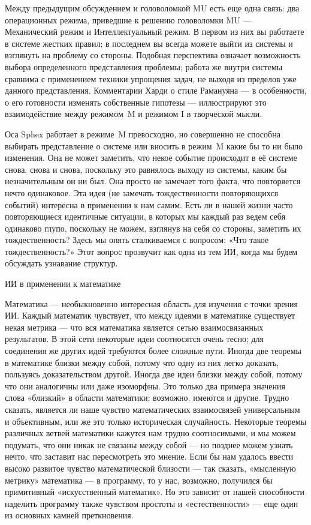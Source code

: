 \documentclass[../main.tex]{subfiles}
\begin{document}
Между предыдущим обсуждением и головоломкой MU есть еще одна связь: два операционных режима, приведшие к решению головоломки MU --- Механический режим и Интеллектуальный режим. В первом из них вы работаете в системе жестких правил; в последнем вы всегда можете выйти из системы и взглянуть на проблему со стороны. Подобная перспектива означает возможность выбора определенного представления проблемы; работа же внутри системы сравнима с применением техники упрощения задач, не выходя из пределов уже данного представления. Комментарии Харди о стиле Рамануяна --- в особенности, о его готовности изменять собственные гипотезы --- иллюстрируют это взаимодействие между режимом~M и режимом I в творческой мысли.

Оса Sphex работает в режиме~M превосходно, но совершенно не способна выбирать представление о системе или вносить в режим~M какие бы то ни было изменения. Она не может заметить, что некое событие происходит в её системе снова, снова и снова, поскольку это равнялось выходу из системы, каким бы незначительным он ни был. Она просто не замечает того факта, что повторяется нечто одинаковое. Эта идея (не замечать тождественности повторяющихся событий) интересна в применении к нам самим. Есть ли в нашей жизни часто повторяющиеся идентичные ситуации, в которых мы каждый раз ведем себя одинаково глупо, поскольку не можем, взглянув на себя со стороны, заметить их тождественность? Здесь мы опять сталкиваемся с вопросом: «Что такое тождественность?» Этот вопрос прозвучит как одна из тем ИИ, когда мы будем обсуждать узнавание структур.

ИИ в применении к математике

Математика --- необыкновенно интересная область для изучения с точки зрения ИИ\@. Каждый математик чувствует, что между идеями в математике существует некая метрика --- что вся математика является сетью взаимосвязанных результатов. В этой сети некоторые идеи соотносятся очень тесно; для соединения же других идей требуются более сложные пути. Иногда две теоремы в математике близки между собой, потому что одну из них легко доказать, пользуясь доказательством другой. Иногда две идеи близки между собой, потому что они аналогичны или даже изоморфны. Это только два примера значения слова «близкий» в области математики; возможно, имеются и другие. Трудно сказать, является ли наше чувство математических взаимосвязей универсальным и объективным, или же это только историческая случайность. Некоторые теоремы различных ветвей математики кажутся нам трудно соотносимыми, и мы можем подумать, что они никак не связаны между собой --- но позднее можем узнать нечто, что заставит нас пересмотреть это мнение. Если бы нам удалось ввести высоко развитое чувство математической близости --- так сказать, «мысленную метрику» математика --- в программу, то у нас, возможно, получился бы примитивный «искусственный математик». Но это зависит от нашей способности наделить программу также чувством простоты и «естественности» --- еще один из основных камней преткновения.
\end{document}
